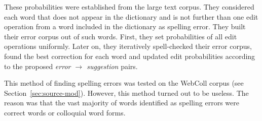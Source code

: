 \documentclass[11pt]{article}
\newcommand{\Sref}[1]{Section~\ref{#1}}
\begin{document}
These probabilities were established from the large text corpus. They
considered each word that does not appear in the dictionary and is not further
than one edit operation from a word included in the dictionary as spelling
error. They built their error corpus out of such words. First, they set
probabilities of all edit operations uniformly. Later on, they iteratively
spell-checked their error corpus, found the best correction for each word and
updated edit probabilities according to the proposed \emph{error $\to$
suggestion} pairs.

This method of finding spelling errors was tested on the WebColl corpus (see
\Sref{sec:source-mod}). However, this method turned out to be useless. The reason
was that the vast majority of words identified as spelling errors were correct
words or colloquial word forms. 
\end{document}
